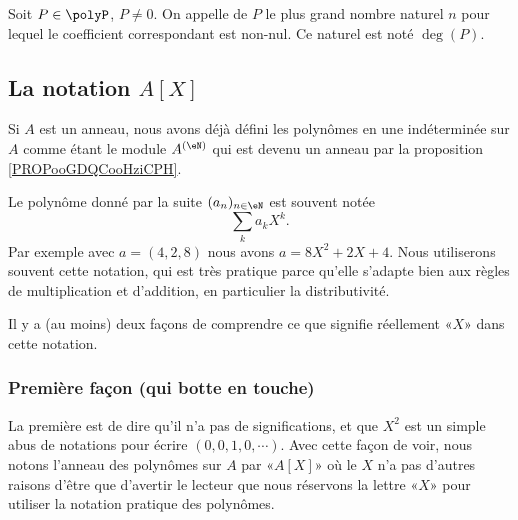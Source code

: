 \begin{definition}  \label{DefDegrePoly}
    Soit \( P \in \polyP\), \( P \neq 0 \). On appelle  de $P$ le plus grand nombre naturel $n$ pour lequel le coefficient correspondant est non-nul. Ce naturel est noté \( \deg(P) \).
\end{definition}

\subsection{La notation ${A[X]}$}
\label{SUBSECooLEKVooFBPSJz}

Si \( A\) est un anneau, nous avons déjà défini les polynômes en une indéterminée sur \( A\) comme étant le module \( A^{(\eN)}\) qui est devenu un anneau par la proposition \ref{PROPooGDQCooHziCPH}.

Le polynôme donné par la suite \( (a_n)_{n\in \eN}\) est souvent notée
\begin{equation}
    \sum_ka_kX^k.
\end{equation}
Par exemple avec \( a=(4,2,8)\) nous avons \( a=8X^2+2X+4\). Nous utiliserons souvent cette notation, qui est très pratique parce qu'elle s'adapte bien aux règles de multiplication et d'addition, en particulier la distributivité.

Il y a (au moins) deux façons de comprendre ce que signifie réellement «\( X\)» dans cette notation.

\subsubsection{Première façon (qui botte en touche)}

La première est de dire qu'il n'a pas de significations, et que \( X^2\) est un simple abus de notations pour écrire \( (0,0,1,0,\cdots)\). Avec cette façon de voir, nous notons l'anneau des polynômes sur \( A\) par «\( A[X]\)» où le \( X\) n'a pas d'autres raisons d'être que d'avertir le lecteur que nous réservons la lettre «\( X\)» pour utiliser la notation pratique des polynômes.

